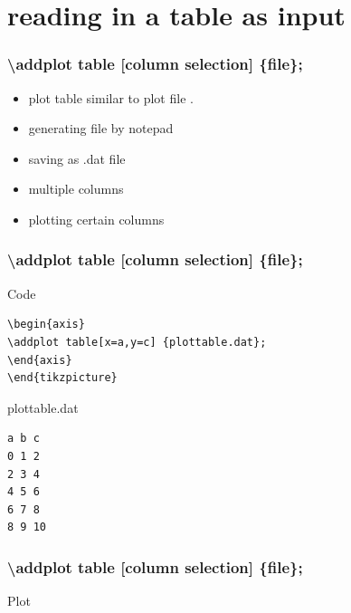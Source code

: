 \documentclass{beamer}
\begin{document}
\section{reading in a table as input}
\begin{frame}[fragile]
\frametitle{\color{blue}\textbackslash addplot table \color{black} [column selection] \{file\};}
\begin{itemize}
\item \color{blue} plot table \color{black} similar to \color{blue} plot file \color{black} .
\item generating file by notepad
\item saving as .dat file
\item multiple columns
\item plotting certain columns
\end{itemize}
\end{frame}
\begin{frame}[fragile]
\frametitle{\color{blue}\textbackslash addplot table \color{black} [column selection] \{file\};}
\begin{block}{Code}
\begin{verbatim}
\begin{axis}
\addplot table[x=a,y=c] {plottable.dat};
\end{axis}
\end{tikzpicture}
\end{verbatim}
\end{block}
\begin{block}{plottable.dat}
\begin{verbatim}
a b c
0 1 2
2 3 4
4 5 6
6 7 8
8 9 10
\end{verbatim}
\end{block}
\end{frame}
\begin{frame}[fragile]
\frametitle{\color{blue}\textbackslash addplot table \color{black} [column selection] \{file\};}
\begin{block}{Plot}
\end{block}
\end{frame}
\end{document}
